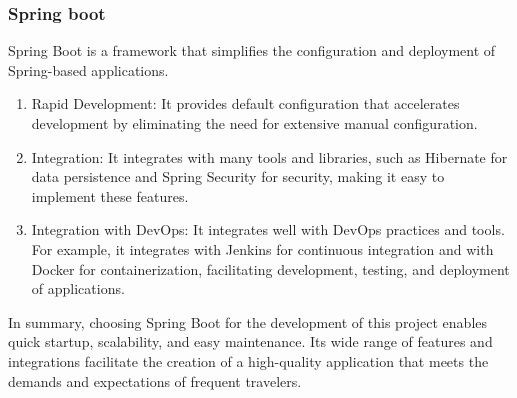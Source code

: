 \documentclass[../memory.tex]{subfiles}
\begin{document}
\subsubsection{Spring boot}
Spring Boot is a framework that simplifies the configuration and deployment of
Spring-based applications.
\begin{enumerate}[label = -]
	\item Rapid Development: It provides default configuration that accelerates
	      development by eliminating the need for extensive manual configuration.
	\item Integration: It integrates with many tools and libraries, such as
	      Hibernate for data persistence and Spring Security for security, making it
	      easy to implement these features.
	\item Integration with DevOps: It integrates well with DevOps practices and
	      tools. For example, it integrates with Jenkins for continuous integration
	      and with Docker for containerization, facilitating development, testing, and
	      deployment of applications.
\end{enumerate}
In summary, choosing Spring Boot for the development of this project enables
quick startup, scalability, and easy maintenance. Its wide range of features and
integrations facilitate the creation of a high-quality application that meets
the demands and expectations of frequent travelers.
\end{document}
